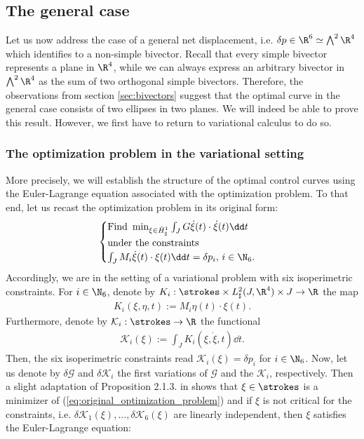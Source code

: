 \subsection{The general case}

Let us now address the case of a general net displacement, i.e. $\delta p \in \R^6 \simeq \bigwedge^2 \R^4$ which identifies to a non-simple bivector. Recall that every simple bivector represents a plane in $\R^4$, while we can always express an arbitrary bivector in $\bigwedge^2 \R^4$ as the sum of two orthogonal simple bivectors. Therefore, the observations from section \ref{sec:bivectors} suggest that the optimal curve in the general case consists of two ellipses in two planes. We will indeed be able to prove this result. However, we first have to return to variational calculus to do so.


\subsubsection{The optimization problem in the variational setting}
More precisely, we will establish the structure of the optimal control curves using the Euler-Lagrange equation associated with the optimization problem. To that end, let us recast the optimization problem in its original form:
\begin{align}
\label{eq:original_optimization_problem}
\begin{cases}
 \text{Find } \min_{\xi \in \dot{H}^1_{\sharp}} \int_{J} G \dot{\xi}(t) \cdot \dot{\xi}(t) \dd t\\
 \text{under the constraints }\\
 \int_{J} M_i \dot{\xi}(t) \cdot \xi(t) \dd t = \delta p_i,\, i \in \N_6.
 \end{cases}
\end{align}
Accordingly, we are in the setting of a variational problem with six isoperimetric constraints. For $i \in \N_6$, denote by $K_i: \strokes \times L^2_\sharp(J, \R^4) \times J \to \R$ the map
\begin{align}
	K_i(\xi, \eta, t) := M_i \eta(t) \cdot \xi(t).
\end{align}
Furthermore, denote by $\mathcal{K}_i : \strokes \to \R$ the functional
\begin{align}
	\mathcal{K}_i(\xi) := \int_{J} K_i(\xi, \dot{\xi}, t) \dd t.
\end{align}
Then, the six isoperimetric constraints read $\mathcal{K}_i(\xi) = \delta p_i$ for $i \in \N_6$. Now, let us denote by $\delta \mathcal{G}$ and $\delta \mathcal{K}_i$ the first variations of $\mathcal{G}$ and the $\mathcal{K}_i$, respectively. Then a slight adaptation of Proposition 2.1.3. in \cite{Kielhoefer2018} shows that $\xi \in \strokes$ is a minimizer of (\ref{eq:original_optimization_problem}) and if $\xi$ is not critical for the constraints, i.e. $\delta \mathcal{K}_1(\xi), \dotsc, \delta \mathcal{K}_6(\xi)$ are linearly independent, then $\xi$ satisfies the Euler-Lagrange equation:

